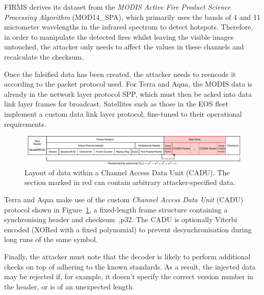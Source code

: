 FIRMS derives its dataset from the \textit{MODIS Active Fire Product Science Processing Algorithm} (MOD14\_SPA), which primarily uses the bands of 4 and 11 micrometer wavelengths in the infrared spectrum to detect hotspots.
Therefore, in order to manipulate the detected fires whilst leaving the visible images untouched, the attacker only needs to affect the values in these channels and recalculate the checksum.

Once the falsified data has been created, the attacker needs to reencode it according to the packet protocol used.
For Terra and Aqua, the MODIS data is already in the network layer protocol SPP, which must then be acked into data link layer frames for broadcast.
Satellites such as those in the EOS fleet implement a custom data link layer protocol, fine-tuned to their operational requirements.

\begin{figure}
    \centering
    \includegraphics[width=\textwidth]{diagrams/cadu_diagram.pdf}
    \caption{Layout of data within a Channel Access Data Unit (CADU). The section marked in red can contain arbitrary attacker-specified data.}
    \label{fig:cadu_diagram}
\end{figure}

Terra and Aqua make use of the custom \textit{Channel Access Data Unit} (CADU) protocol shown in Figure~\ref{fig:cadu_diagram}, a fixed-length frame structure containing a synchronising header and checksum~\cite{spaceGroundAqua},p32.
The CADU is optionally Viterbi encoded (XORed with a fixed polynomial) to prevent desynchronisation during long runs of the same symbol.

Finally, the attacker must note that the decoder is likely to perform additional checks on top of adhering to the known standards.
As a result, the injected data may be rejected if, for example, it doesn't specify the correct version number in the header, or is of an unexpected length.


